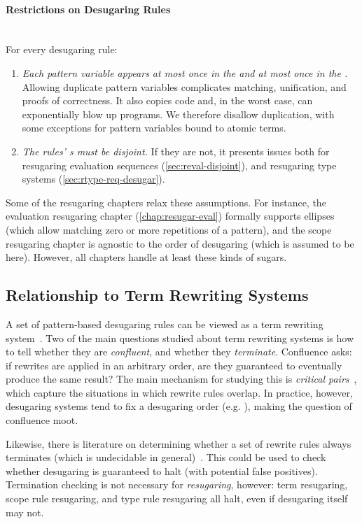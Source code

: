 \paragraph{Restrictions on Desugaring Rules}\\ \noindent
For every desugaring rule:
\begin{enumerate}
\item \emph{Each pattern variable appears at most once in the  and at
  most once in the .}
  Allowing duplicate pattern variables complicates matching, unification,
  and proofs of correctness. It also copies code
  and, in the worst case, can exponentially blow up programs.
  We therefore disallow duplication,
  with some exceptions for pattern variables bound to atomic terms.
\item \emph{The rules' s must be disjoint.} If they
  are not, it presents issues both for resugaring evaluation sequences
  (\cref{sec:reval-disjoint}), and resugaring type systems
  (\cref{sec:rtype-req-desugar}).
\end{enumerate}

Some of the resugaring chapters relax these assumptions. For instance, the
evaluation resugaring chapter (\cref{chap:resugar-eval}) formally
supports ellipses (which allow matching zero or more repetitions of a
pattern), and the scope resugaring chapter is agnostic to the order of
desugaring (which is assumed to be  here). However, all
chapters handle at least these kinds of sugars.

\subsection{Relationship to Term Rewriting Systems}

A set of pattern-based desugaring rules can be viewed as a term
rewriting system~\cite{trs}. Two of the main questions studied about
term rewriting systems is how to tell whether they are
\emph{confluent}, and whether they \emph{terminate}. Confluence asks:
if rewrites are applied in an arbitrary order, are they guaranteed to
eventually produce the same result? The main mechanism for studying
this is \emph{critical pairs}~\cite{critical-pairs},
which capture the situations in which rewrite rules overlap. In
practice, however, desugaring systems tend to fix a desugaring order
(e.g. ), making the question of confluence moot.

Likewise, there is literature on determining whether a set of rewrite
rules always terminates (which is undecidable in
general)~\cite{trs-termination-undecidable}. This could be used to
check whether desugaring is guaranteed to halt (with potential false
positives). Termination checking is not necessary for
\emph{resugaring}, however: term resugaring, scope rule resugaring,
and type rule resugaring all halt, even if desugaring itself may not.

